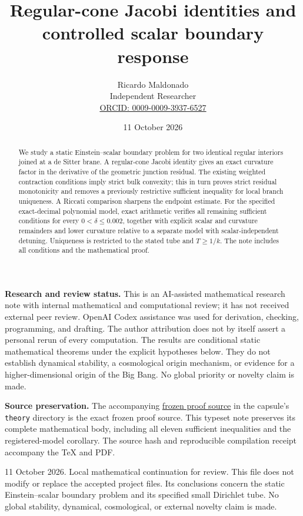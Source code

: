 \documentclass[11pt]{article}
\title{Regular-cone Jacobi identities and\\controlled scalar boundary response}
\author{Ricardo Maldonado\\Independent Researcher\\
\small\href{https://orcid.org/0009-0009-3937-6527}{ORCID: 0009-0009-3937-6527}}
\date{11 October 2026}
\begin{document}
\maketitle
\begin{abstract}
We study a static Einstein--scalar boundary problem for two identical regular
interiors joined at a de Sitter brane. A regular-cone Jacobi identity gives an
exact curvature factor in the derivative of the geometric junction residual.
The existing weighted contraction conditions imply strict bulk convexity;
this in turn proves strict residual monotonicity and removes a previously
restrictive sufficient inequality for local branch uniqueness. A Riccati
comparison sharpens the endpoint estimate. For the specified exact-decimal
polynomial model, exact arithmetic verifies all remaining sufficient conditions
for every $0<\delta\leq0.002$, together with explicit scalar and curvature
remainders and lower curvature relative to a separate model with
scalar-independent detuning. Uniqueness is restricted to the stated tube and
$T\geq1/k$. The note includes all conditions and the mathematical proof.
\end{abstract}

\textbf{Research and review status.}
This is an AI-assisted mathematical research note with internal mathematical
and computational review; it has not received external peer review.
OpenAI Codex assistance was used for derivation, checking, programming, and
drafting. The author attribution does not by itself assert a personal rerun of
every computation. The results are conditional static mathematical theorems
under the explicit hypotheses below. They do not establish dynamical stability,
a cosmological origin mechanism, or evidence for a higher-dimensional origin
of the Big Bang. No global priority or novelty claim is made.

\textbf{Source preservation.}
The accompanying \href{../theory/JACOBI_ENDPOINT_MONOTONICITY.md}{frozen proof source}
in the capsule's \texttt{theory} directory is the
exact frozen proof source. This typeset note preserves its complete mathematical
body, including all eleven sufficient inequalities and the registered-model
corollary. The source hash and reproducible compilation receipt accompany the
TeX and PDF.

11 October 2026. Local mathematical continuation for review. This file does not
modify or replace the accepted project files. Its conclusions concern the static
Einstein--scalar boundary problem and its specified small Dirichlet tube. No
global stability, dynamical, cosmological, or external novelty claim is made.
\end{document}
